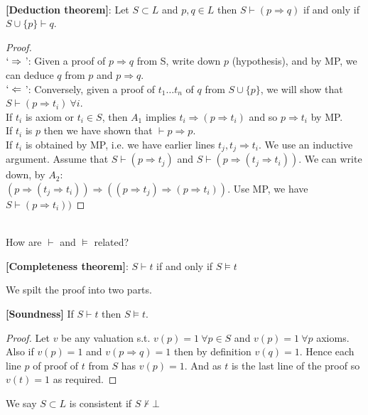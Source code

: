 ~\\
\begin{proposition}{\bf[Deduction theorem]}\label{D;Deduction}:
Let $S \subset L$ and $p, q \in L$ then $S \vdash (p \Rightarrow q)$
if and only if $S \cup \{p\} \vdash q$.
\end{proposition}
\begin{proof}
~\\
$`\Rightarrow$ ': Given a proof of $p \Rightarrow q$ from S,
write down $p$ (hypothesis), and by MP, we can deduce $q$ from $p$
and  $p \Rightarrow q$. \\
$`\Leftarrow$ ': Conversely, given a proof of $t_1 \ldots t_n$ of $q$
from $S \cup \{p\}$, we will show that $S \vdash (p \Rightarrow t_i) ~\forall i$.\\
If $t_i$ is axiom or $t_i \in S$, then $A_1$ implies $t_i \Rightarrow (p \Rightarrow t_i)$
and so $p \Rightarrow t_i$ by MP.\\
If $t_i$ is $p$ then we have shown that $\vdash p \Rightarrow p$.\\
If $t_i$ is obtained by MP, i.e. we have earlier lines $t_j, t_j
\Rightarrow t_i$. We use an inductive argument. Assume that $S \vdash
(p \Rightarrow t_j)$ and $S \vdash (p \Rightarrow (t_j \Rightarrow t_i))$.
 We can write down, by $A_2$:\\
$(p \Rightarrow (t_j \Rightarrow t_i)) \Rightarrow ((p \Rightarrow t_j)
\Rightarrow (p \Rightarrow t_i))$. Use MP, we have $S \vdash (p \Rightarrow t_i))$
\end{proof}
~\\
How are $\vdash$ and $\models$ related?
\begin{theorem}{\bf[Completeness theorem]}\label{C;Completeness}:
$S \vdash t$ if and only if $S \models t$
\end{theorem}
We spilt the proof into two parts.
\begin{proposition}{\bf[Soundness]}\label{S;Soundness} If $S \vdash t$
 then $S \models t$.
\end{proposition}
\begin{proof}
Let $v$ be any valuation s.t. $v(p)=1 ~\forall p \in S$ and $v(p)=1
~\forall p$ axioms. Also if $v(p)=1$ and $v(p \Rightarrow q)=1$ then
by definition $v(q)=1$. Hence each line $p$ of proof of $t$ from $S$
has $v(p)=1$. And as $t$ is the last line of the proof so $v(t)=1$ as required.
\end{proof}
\begin{definition}
We say $S \subset L$ is consistent if $S \not\vdash \bot$
\end{definition}

